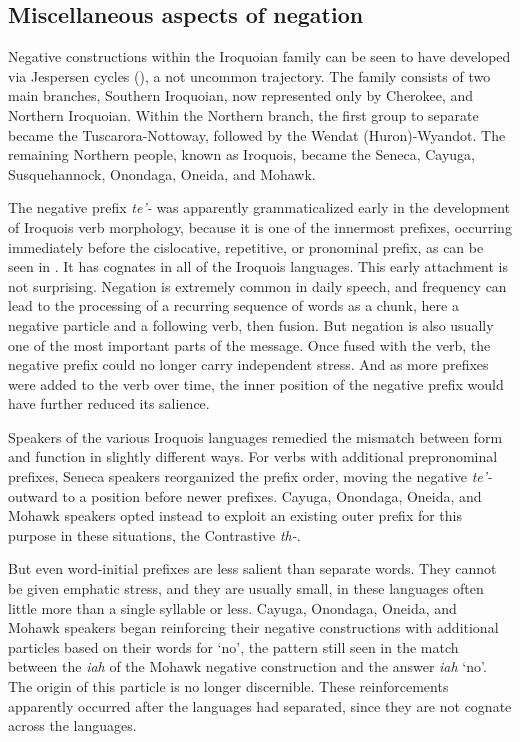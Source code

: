 \documentclass[output=paper,colorlinks,citecolor=brown]{langscibook}
\begin{document}
\subsection{Miscellaneous aspects of negation}

Negative constructions within the Iroquoian family can be seen to have developed via Jespersen cycles (\citealt{Mithun1995affixation,Mithun2016}), a not uncommon trajectory. The family consists of two main branches, Southern Iroquoian, now represented only by Cherokee, and Northern Iroquoian. Within the Northern branch, the first group to separate became the Tuscarora-Nottoway, followed by the Wendat \linebreak (Huron)-Wyandot. The remaining Northern people, known as Iroquois, became the Seneca, Cayuga, Susquehannock, Onondaga, Oneida, and Mohawk.

The negative prefix \textit{te’-} was apparently grammaticalized early in the development of Iroquois verb morphology, because it is one of the innermost prefixes, occurring  immediately before the cislocative, repetitive, or pronominal prefix, as can be seen in . It has cognates in all of the Iroquois languages. This early attachment is not surprising. Negation is extremely common in daily speech, and frequency can lead to the processing of a recurring sequence of words as a chunk, here a negative particle and a following verb, then fusion. But negation is also usually one of the most important parts of the message. Once fused with the verb, the negative prefix could no longer carry independent stress. And as more prefixes were added to the verb over time, the inner position of the negative prefix would have further reduced its salience.

Speakers of the various Iroquois languages remedied the mismatch between form and function in slightly different ways. For verbs with additional prepronominal prefixes, Seneca speakers reorganized the prefix order, moving the negative \textit{te’-} outward to a position before newer prefixes. Cayuga, Onondaga, Oneida, and Mohawk speakers opted instead to exploit an existing outer prefix for this purpose in these situations, the Contrastive \textit{th-}.

But even word-initial prefixes are less salient than separate words. They cannot be given emphatic stress, and they are usually small, in these languages often little more than a single syllable or less. Cayuga, Onondaga, Oneida, and Mohawk speakers began reinforcing their negative constructions with additional particles based on their words for ‘no’, the pattern still seen in the match between the \textit{iah} of the Mohawk negative construction and the answer \textit{iah} ‘no’. The origin of this particle is no longer discernible. These reinforcements apparently occurred after the languages had separated, since they are not cognate across the languages.
\end{document}

